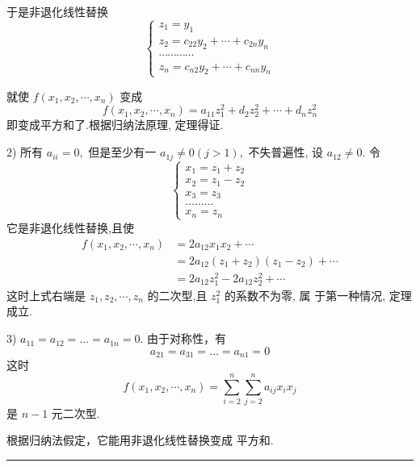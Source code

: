 \documentclass[13pt]{beamer}
\def\qed{\nopagebreak\hfill{\rule{4pt}{7pt}}\medbreak}
\begin{document}
\begin{frame}
于是非退化线性替换
\[
\left\{\begin{array}{l}
z_{1}=y_{1} \\
z_{2}=c_{22} y_{2}+\cdots+c_{2 n} y_{n} \\
\cdots \cdots \cdots \cdots \\
z_{n}=c_{n 2} y_{2}+\cdots+c_{n n} y_{n}
\end{array}\right.
\]

就使 $f\left(x_{1}, x_{2}, \cdots, x_{n}\right)$ 变成
\[
f\left(x_{1}, x_{2}, \cdots, x_{n}\right)=a_{11} z_{1}^{2}+d_{2} z_{2}^{2}+\cdots+d_{n} z_{n}^{2}
\]
即变成平方和了.根据归纳法原理, 定理得证. 
\end{frame}

\begin{frame}
2) 所有 $a_{i i}=0,$ 但是至少有一 $a_{1 j} \neq 0(j>1),$ 不失普遍性, 设 $a_{12} \neq 0 .$ 令
\[
\left\{\begin{array}{l}
x_{1}=z_{1}+z_{2} \\
x_{2}=z_{1}-z_{2} \\
x_{3}=z_{3} \\
\dots \dots \dots \\
x_{n}=z_{n}
\end{array}\right.
\]
它是非退化线性替换,且使
\[
\begin{aligned}
f\left(x_{1}, x_{2}, \cdots, x_{n}\right) &=2 a_{12} x_{1} x_{2}+\cdots \\
&=2 a_{12}\left(z_{1}+z_{2}\right)\left(z_{1}-z_{2}\right)+\cdots \\
&=2 a_{12} z_{1}^{2}-2 a_{12} z_{2}^{2}+\cdots
\end{aligned}
\]
这时上式右端是 $z_{1}, z_{2}, \cdots, z_{n}$ 的二次型,且 $z_{1}^{2}$ 的系数不为零, 属 于第一种情况, 定理成立. 
\end{frame}


\begin{frame}
3) $a_{11}=a_{12}=\dots=a_{1 n}=0$.
由于对称性，有
\[
a_{21}=a_{31}=\dots=a_{n 1}=0
\]
这时
\[
f\left(x_{1}, x_{2}, \cdots, x_{n}\right)=\sum_{i=2}^{n} \sum_{j=2}^{n} a_{i j} x_{i} x_{j}
\]
是 $n-1$ 元二次型.

根据归纳法假定，它能用非退化线性替换变成
平方和. 
\qed
\end{frame}
\end{document}
